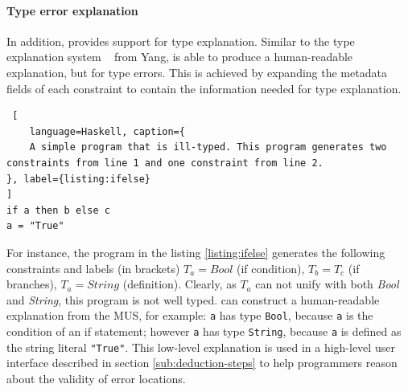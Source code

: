 \paragraph{Type error explanation}

In addition, \chameleon{} provides support for type explanation. Similar to the type explanation system ~\cite{jun2002explaining} from Yang,  \chameleon{} is able to produce a human-readable explanation, but for type errors. This is achieved by expanding the metadata fields of each constraint to contain the information needed for type explanation. 

\begin{lstlisting} [
    language=Haskell, caption={
    A simple program that is ill-typed. This program generates two constraints from line 1 and one constraint from line 2.
}, label={listing:ifelse}
]
if a then b else c
a = "True"
\end{lstlisting}
For instance, the program in the listing \ref{listing:ifelse} \chameleon{}  generates the following constraints and labels (in brackets) $T_a = Bool$ (if condition), $T_b = T_c$ (if branches), $T_a= String$  (definition). Clearly, as $T_a$ can not unify with both \textit{Bool} and \textit{String}, this program is not well typed. \chameleon{} can construct a human-readable explanation from the MUS, for example: \texttt{a} has type \texttt{Bool}, because \texttt{a} is the condition of an if statement; however \texttt{a} has type \texttt{String}, because \texttt{a} is defined as the string literal \texttt{"True"}. This low-level explanation is used in a high-level user interface described in section \ref{sub:deduction-steps} to help programmers reason about the validity of error locations.


